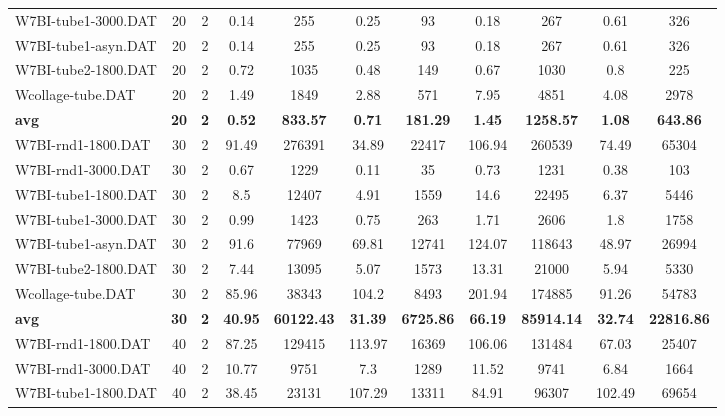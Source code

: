 \begin{table}[!ht]
\begin{tabular}{lcccccccccc}
W7BI-tube1-3000.DAT & 20 & 2 &  \textcolor{blue2}{0.14} & 255 & 0.25 & 93 & 0.18 & 267 & 0.61 & 326 \\
W7BI-tube1-asyn.DAT & 20 & 2 &  \textcolor{blue2}{0.14} & 255 & 0.25 & 93 & 0.18 & 267 & 0.61 & 326 \\
W7BI-tube2-1800.DAT & 20 & 2 & 0.72 & 1035 &  \textcolor{blue2}{0.48} & 149 & 0.67 & 1030 & 0.8 & 225 \\
Wcollage-tube.DAT & 20 & 2 &  \textcolor{blue2}{1.49} & 1849 & 2.88 & 571 & 7.95 & 4851 & 4.08 & 2978 \\
\cline{1-11} \textbf{avg} & \textbf{20} & \textbf{2} & \textbf{0.52} & \textbf{833.57} & \textbf{0.71} & \textbf{181.29} & \textbf{1.45} & \textbf{1258.57} & \textbf{1.08} & \textbf{643.86} \\ \cline{1-11}
W7BI-rnd1-1800.DAT & 30 & 2 & 91.49 & 276391 &  \textcolor{blue2}{34.89} & 22417 & 106.94 & 260539 & 74.49 & 65304 \\
W7BI-rnd1-3000.DAT & 30 & 2 & 0.67 & 1229 &  \textcolor{blue2}{0.11} & 35 & 0.73 & 1231 & 0.38 & 103 \\
W7BI-tube1-1800.DAT & 30 & 2 & 8.5 & 12407 &  \textcolor{blue2}{4.91} & 1559 & 14.6 & 22495 & 6.37 & 5446 \\
W7BI-tube1-3000.DAT & 30 & 2 & 0.99 & 1423 &  \textcolor{blue2}{0.75} & 263 & 1.71 & 2606 & 1.8 & 1758 \\
W7BI-tube1-asyn.DAT & 30 & 2 & 91.6 & 77969 & 69.81 & 12741 & 124.07 & 118643 &  \textcolor{blue2}{48.97} & 26994 \\
W7BI-tube2-1800.DAT & 30 & 2 & 7.44 & 13095 &  \textcolor{blue2}{5.07} & 1573 & 13.31 & 21000 & 5.94 & 5330 \\
Wcollage-tube.DAT & 30 & 2 &  \textcolor{blue2}{85.96} & 38343 & 104.2 & 8493 & 201.94 & 174885 & 91.26 & 54783 \\
\cline{1-11} \textbf{avg} & \textbf{30} & \textbf{2} & \textbf{40.95} & \textbf{60122.43} & \textbf{31.39} & \textbf{6725.86} & \textbf{66.19} & \textbf{85914.14} & \textbf{32.74} & \textbf{22816.86} \\ \cline{1-11}
W7BI-rnd1-1800.DAT & 40 & 2 & 87.25 & 129415 & 113.97 & 16369 & 106.06 & 131484 &  \textcolor{blue2}{67.03} & 25407 \\
W7BI-rnd1-3000.DAT & 40 & 2 & 10.77 & 9751 & 7.3 & 1289 & 11.52 & 9741 &  \textcolor{blue2}{6.84} & 1664 \\
W7BI-tube1-1800.DAT & 40 & 2 &  \textcolor{blue2}{38.45} & 23131 & 107.29 & 13311 & 84.91 & 96307 & 102.49 & 69654 \\

\end{tabular}
\end{table}
